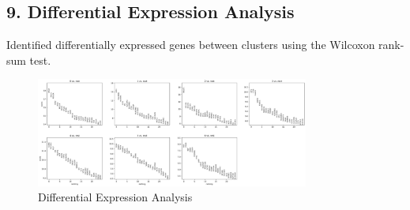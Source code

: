 \documentclass[12pt]{article}
\begin{document}
\subsection{9. Differential Expression Analysis}
Identified differentially expressed genes between clusters using the Wilcoxon rank-sum test.

\begin{figure}[H]
    \centering
    \includegraphics[width=0.8\textwidth]{de.png}
    \caption{Differential Expression Analysis}
    \label{fig:de}
\end{figure}
\end{document}
